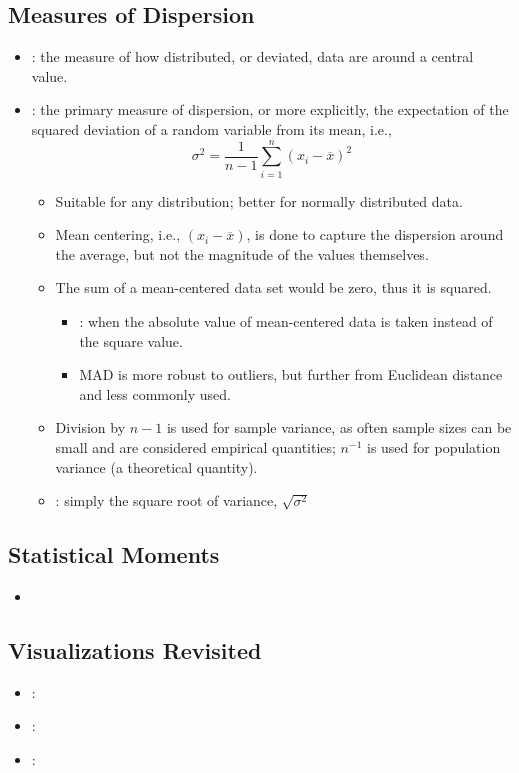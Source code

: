 \begin{itemize}
  \subsection{Measures of Dispersion}
  \begin{itemize}
    \item {}: the measure of how distributed, or deviated, data are around a central value.
    \item {}: the primary measure of dispersion, or more explicitly, the expectation of the squared deviation of a random variable from its mean, i.e.,
    \[%
    \sigma^2 = \frac{1}{n-1}\sum_{i = 1}^{n}(x_i-\overline{x})^2
    \]%
    \begin{itemize}
      \item Suitable for any distribution; better for normally distributed data.
      \item Mean centering, i.e., \((x_i - \overline{x})\), is done to capture the dispersion around the average, but not the magnitude of the values themselves.
      \item The sum of a mean-centered data set would be zero, thus it is squared.
        \begin{itemize}
          \item {}: when the absolute value of mean-centered data is taken instead of the square value. 
          \item MAD is more robust to outliers, but further from Euclidean distance and less commonly used. 
        \end{itemize}
      \item Division by \(n-1\) is used for sample variance, as often sample sizes can be small and are considered empirical quantities; \(n ^{-1}\) is used for population variance (a theoretical quantity).
      \item {}: simply the square root of variance, \(\sqrt{\sigma^2}\)
    \end{itemize}
  \end{itemize}

  \subsection{Statistical Moments}
  \begin{itemize}
    \item 
  \end{itemize}
  
  \subsection{Visualizations Revisited}
  \begin{itemize}
    \item {}:
    \item {}:
    \item {}:
  \end{itemize}
  
\end{itemize}
